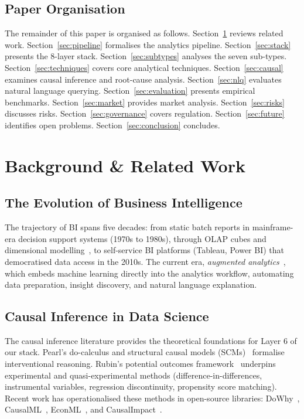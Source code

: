 \documentclass[12pt, a4paper]{article}
\begin{document}
\subsection{Paper Organisation}
The remainder of this paper is organised as follows. Section~\ref{sec:background} reviews related work. Section~\ref{sec:pipeline} formalises the analytics pipeline. Section~\ref{sec:stack} presents the 8-layer stack. Section~\ref{sec:subtypes} analyses the seven sub-types. Section~\ref{sec:techniques} covers core analytical techniques. Section~\ref{sec:causal} examines causal inference and root-cause analysis. Section~\ref{sec:nlq} evaluates natural language querying. Section~\ref{sec:evaluation} presents empirical benchmarks. Section~\ref{sec:market} provides market analysis. Section~\ref{sec:risks} discusses risks. Section~\ref{sec:governance} covers regulation. Section~\ref{sec:future} identifies open problems. Section~\ref{sec:conclusion} concludes.

\section{Background \& Related Work}\label{sec:background}

\subsection{The Evolution of Business Intelligence}
The trajectory of BI spans five decades: from static batch reports in mainframe-era decision support systems (1970s to 1980s), through OLAP cubes and dimensional modelling~\citep{kimball2013data}, to self-service BI platforms (Tableau, Power BI) that democratised data access in the 2010s. The current era, \emph{augmented analytics}~\citep{gartner2024augmented}, which embeds machine learning directly into the analytics workflow, automating data preparation, insight discovery, and natural language explanation.

\subsection{Causal Inference in Data Science}
The causal inference literature provides the theoretical foundations for Layer 6 of our stack. Pearl's do-calculus and structural causal models (SCMs)~\citep{pearl2009causality} formalise interventional reasoning. Rubin's potential outcomes framework~\citep{rubin2005causal} underpins experimental and quasi-experimental methods (difference-in-differences, instrumental variables, regression discontinuity, propensity score matching). Recent work has operationalised these methods in open-source libraries: DoWhy~\citep{sharma2020dowhy}, CausalML~\citep{chen2020causalml}, EconML~\citep{econml2019}, and CausalImpact~\citep{brodersen2015causalimpact}.
\end{document}
